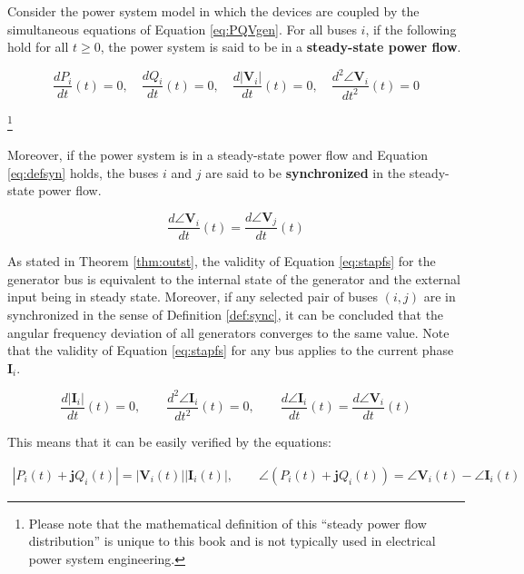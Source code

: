 \documentclass[graybox, envcountchap]{svmult}
\begin{document}
\begin{definition} \label{def:sync}

Consider the power system model in which the devices are coupled by the
simultaneous equations of Equation \ref{eq:PQVgen}. For all buses $i$, if the
following hold for all $t\geq0$, the power system is said to be in a
\textbf{steady-state power flow}.

\begin{equation}\label{eq:stapfs}
  \frac{dP_i}{dt}(t)=0
  ,\quad
  \frac{dQ_i}{dt}(t)=0
  ,\quad
  \frac{d|\bm{V}_i|}{dt}(t)=0
  ,\quad
  \frac{d^2 \angle \bm{V}_i }{dt^2}(t)=0
\end{equation}

\footnote{
Please note that the mathematical definition of this “steady power flow distribution” is unique to this book and is not typically used in electrical power system engineering.
}

Moreover, if the power system is in a steady-state power flow and Equation
\ref{eq:defsyn} holds, the buses $i$ and $j$ are said to be
\textbf{synchronized} in the steady-state power flow.

\begin{equation}\label{eq:defsyn}
  \frac{d \angle \bm{V}_i}{dt}(t) =  \frac{d \angle \bm{V}_j}{dt}(t)
\end{equation}
\end{definition}
As stated in Theorem \ref{thm:outst}, the validity of Equation \ref{eq:stapfs}
for the generator bus is equivalent to the internal state of the generator and
the external input being in steady state. Moreover, if any selected
pair of buses $(i,j)$ are in synchronized in the sense of Definition
\ref{def:sync}, it can be concluded that the angular frequency deviation of all
generators converges to the same value. Note that the validity of Equation
\ref{eq:stapfs} for any bus applies to the current phase $\bm{I}_i$.

\begin{equation*}
  \frac{d|\bm{I}_i|}{dt}(t)=0
  ,\qquad
  \frac{d^2 \angle \bm{I}_i }{dt^2}(t)=0
  ,\qquad
  \frac{d \angle \bm{I}_i }{dt}(t) = \frac{d \angle \bm{V}_i }{dt} (t)
\end{equation*}

This means that it can be easily verified by the equations:

\begin{align*}
  |P_i(t) + \bm{j} Q_i(t)| = |\bm{V}_i(t)| |\bm{I}_i(t)|
  ,\qquad
  \angle(P_i(t) + \bm{j} Q_i(t)) = \angle \bm{V}_i(t) - \angle \bm{I}_i(t)
\end{align*}
\end{document}
